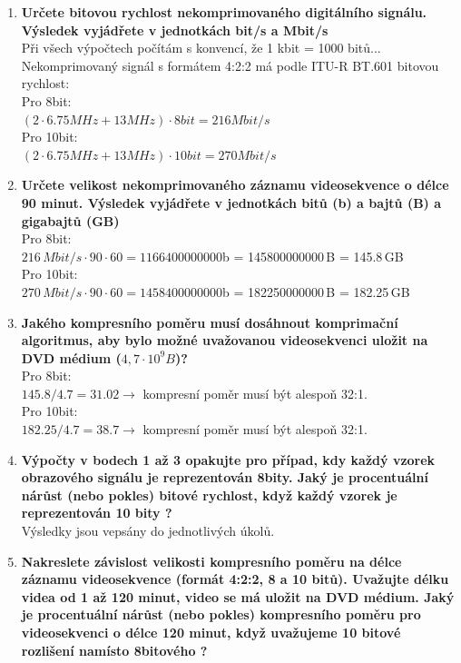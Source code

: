 \documentclass[10pt, a4paper]{article}%
\begin{document}
		\begin{enumerate}
			\item \textbf{Určete bitovou rychlost nekomprimovaného digitálního signálu. Výsledek vyjádřete v jednotkách bit/s a Mbit/s}\\
			Při všech výpočtech počítám s konvencí, že 1 kbit = 1000 bitů...\\
			Nekomprimovaný signál s formátem 4:2:2 má podle ITU-R BT.601 bitovou rychlost:\\
			Pro 8bit:\\
			$(2\cdot 6.75MHz + 13MHz) \cdot 8bit  = 216Mbit/s $\\
			Pro 10bit:\\
			$(2\cdot 6.75MHz + 13MHz) \cdot 10bit  = 270Mbit/s $\\
			\item \textbf{Určete velikost nekomprimovaného záznamu videosekvence o délce 90 minut. Výsledek vyjádřete v jednotkách bitů (b) 
			a bajtů (B) a gigabajtů (GB)}\\
			Pro 8bit:\\
			$216\,Mbit/s \cdot 90 \cdot 60 = 1166 400 000 000$b = 145800000000\,B = 145.8\,GB\\
			Pro 10bit:\\
			$270\,Mbit/s \cdot 90 \cdot 60 = 1458 400 000 000$b = 182250000000\,B = 182.25\,GB\\

			\item \textbf{Jakého kompresního poměru musí dosáhnout komprimační algoritmus, aby bylo možné uvažovanou videosekvenci uložit na DVD médium
			($4,7\cdot 10^9 B$)?}\\
			Pro 8bit:\\
			$145.8/4.7 = 31.02 \rightarrow$ kompresní poměr musí být alespoň 32:1.\\
			Pro 10bit:\\
			$182.25/4.7 = 38.7 \rightarrow$ kompresní poměr musí být alespoň 32:1.\\


			\item \textbf{Výpočty v bodech 1 až 3 opakujte pro případ, kdy každý vzorek obrazového signálu je reprezentován 8bity. Jaký je procentuální nárůst
			(nebo pokles) bitové rychlost, když každý vzorek je reprezentován 10 bity ?}\\
			Výsledky jsou vepsány do jednotlivých úkolů.\\
			\clearpage
			\item \textbf{Nakreslete závislost velikosti kompresního poměru na délce záznamu videosekvence (formát 4:2:2, 8 a 10 bitů). Uvažujte
			délku videa od 1 až 120 minut, video se má uložit na DVD médium. Jaký je procentuální nárůst (nebo pokles) kompresního poměru pro videosekvenci o délce 120 minut,
			když uvažujeme 10 bitové rozlišení namísto 8bitového ?}\\


\end{enumerate}
\end{document}
